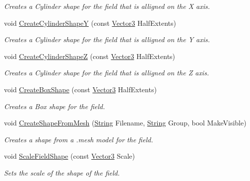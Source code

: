 \begin{DoxyCompactItemize}
\begin{DoxyCompactList}\small\item\em Creates a Cylinder shape for the field that is alligned on the X axis. \item\end{DoxyCompactList}\item 
void \hyperlink{classphys_1_1AreaEffect_ad1aece61b9e2c468923d969eb7c17509}{CreateCylinderShapeY} (const \hyperlink{classphys_1_1Vector3}{Vector3} HalfExtents)
\begin{DoxyCompactList}\small\item\em Creates a Cylinder shape for the field that is alligned on the Y axis. \item\end{DoxyCompactList}\item 
void \hyperlink{classphys_1_1AreaEffect_a64202e31ec319d43c95e8ea1880bc08f}{CreateCylinderShapeZ} (const \hyperlink{classphys_1_1Vector3}{Vector3} HalfExtents)
\begin{DoxyCompactList}\small\item\em Creates a Cylinder shape for the field that is alligned on the Z axis. \item\end{DoxyCompactList}\item 
void \hyperlink{classphys_1_1AreaEffect_aad0830b45f8348905d4b323860b37b37}{CreateBoxShape} (const \hyperlink{classphys_1_1Vector3}{Vector3} HalfExtents)
\begin{DoxyCompactList}\small\item\em Creates a Box shape for the field. \item\end{DoxyCompactList}\item 
void \hyperlink{classphys_1_1AreaEffect_a129cfe777f13ea62727f684761778bcb}{CreateShapeFromMesh} (\hyperlink{namespacephys_aa03900411993de7fbfec4789bc1d392e}{String} Filename, \hyperlink{namespacephys_aa03900411993de7fbfec4789bc1d392e}{String} Group, bool MakeVisible)
\begin{DoxyCompactList}\small\item\em Creates a shape from a .mesh model for the field. \item\end{DoxyCompactList}\item 
void \hyperlink{classphys_1_1AreaEffect_a9407bf7416a804757d52127a3efae747}{ScaleFieldShape} (const \hyperlink{classphys_1_1Vector3}{Vector3} Scale)
\begin{DoxyCompactList}\small\item\em Sets the scale of the shape of the field. \item\end{DoxyCompactList}\item 

\end{DoxyCompactItemize}
